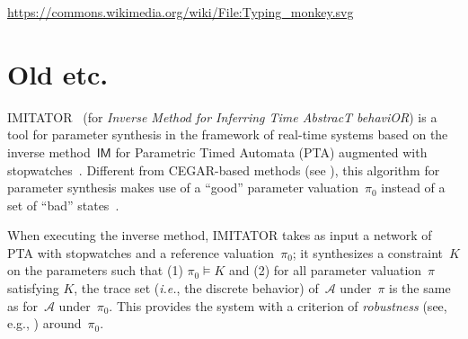 \documentclass[a4paper,11pt]{report}
\newcommand{\A}{\mathcal{A}}
\newcommand{\Ko}{K}
\newcommand{\pio}{\pi_0}
\newcommand{\piprime}{\pi}
\newcommand{\IM}{\ensuremath{\mathsf{IM}}}
\newcommand{\hytech}{{\sc HyTech}}
\newcommand{\imitator}{\textsf{IMITATOR}}
\newcommand{\ie}{\textcolor{colorok}{\textit{i.e.}, }}
\begin{document}
\url{https://commons.wikimedia.org/wiki/File:Typing_monkey.svg}


\newpage




\ifdefined\DraftVersion

\chapter{Old etc.}


\imitator{}~\cite{AFKS12} (for \emph{Inverse Method for Inferring Time AbstracT behaviOR}) is a tool for parameter synthesis in the framework of real-time systems based on the inverse method~$\IM$ for Parametric Timed Automata (PTA) augmented with stopwatches~\cite{AHV93,AM02}.
Different from CEGAR-based methods (see \cite{cgjlv00}), this algorithm for parameter synthesis makes use of a ``good'' parameter valuation~$\pio$ instead of a set of ``bad'' states~\cite{AS13}.

When executing the inverse method, \imitator{} takes as input a network of PTA with stopwatches
and a reference valuation~$\pio$; it synthesizes a constraint~$\Ko$ on the parameters such that (1) $\pio \models \Ko$ and (2) for all parameter valuation~$\piprime$ satisfying $\Ko$, the trace set (\ie{} the discrete behavior) of~$\A$ under~$\piprime$ is the same as for~$\A$ under~$\pio$.
This provides the system with a criterion of \emph{robustness} (see, e.g., \cite{Markey11})
around~$\pio$.


\end{document}
